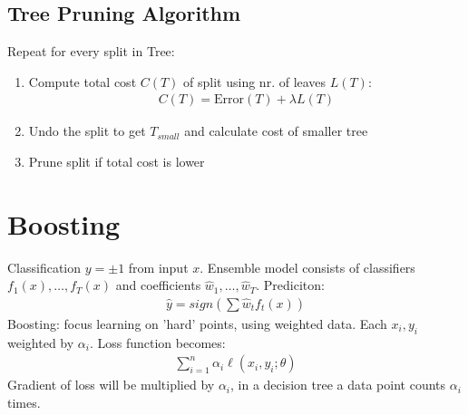\documentclass[8pt, a4paper, landscape, includeheadfoot]{extarticle}
\begin{document}
\begin{multicols*}{4}
	\subsection{Tree Pruning Algorithm}
	Repeat for every split in Tree:
	\begin{enumerate}[itemsep=0pt]
		\item Compute total cost $C(T)$ of split using nr. of leaves $L(T)$:
		      \begin{align*}
			      C(T) = \text{Error}(T) + \lambda L(T)
		      \end{align*}
		\item Undo the split to get $T_{small}$ and calculate cost of smaller tree
		\item Prune split if total cost is lower
	\end{enumerate}
	\section{Boosting}
	Classification $y = \pm 1$ from input $x$. Ensemble model consists of classifiers $f_1(x), \dots, f_T(x)$ and coefficients $\hat{w}_1, \dots, \hat{w}_T$. Prediciton:
	\begin{align}
		\hat{y} = sign\left(\sum \hat{w}_t f_t(x)\right)
	\end{align}
	Boosting: focus learning on 'hard' points, using weighted data. Each $x_i, y_i$ weighted by $\alpha_i$. Loss function becomes:
	\begin{align*}
		\sum_{i=1}^{n}\alpha_i\ell(x_i, y_i; \theta)
	\end{align*}
	Gradient of loss will be multiplied by $\alpha_i$, in a decision tree a data point counts $\alpha_i$ times.

\end{multicols*}
\end{document}
